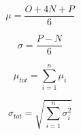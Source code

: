 \documentclass{letter}
\begin{document}
$$\mu = \frac{O+4N+P}{6}$$

$$\sigma = \frac{P-N}{6}$$

$$\mu_{tot} = \sum_{i=1}^{n}\mu_{i}$$

$$\sigma_{tot} = \sqrt{\sum_{i=1}^{n}\sigma_{i}^{2}}$$
\end{document}
